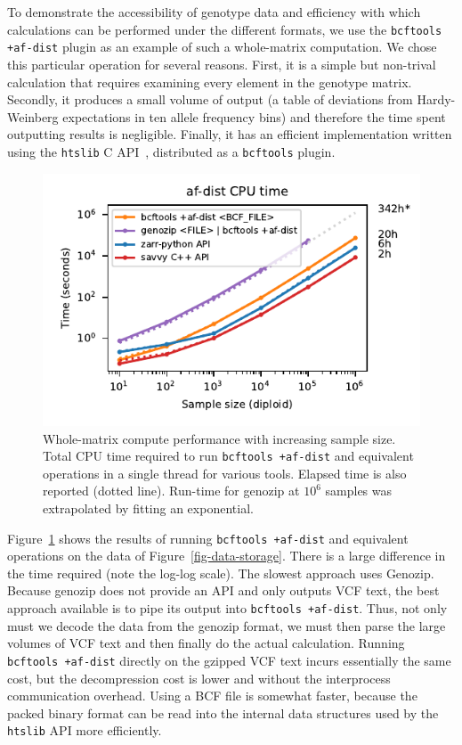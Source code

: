 \documentclass[a4paper,num-refs]{oup-contemporary}
\begin{document}
To demonstrate the accessibility of genotype data and efficiency with 
which calculations can be performed under the different formats,
we use the \texttt{bcftools +af-dist} plugin as an example of such a whole-matrix
computation. 
We chose this particular operation for several
reasons. First, it is a simple but non-trival calculation that requires 
examining every element in the genotype matrix.
Secondly, it produces a small volume of output (a table of
deviations from Hardy-Weinberg expectations in ten allele frequency
bins) and therefore the time spent outputting results is negligible.
Finally, it has an efficient implementation written using the 
\texttt{htslib} C API~\citep{bonfield2021htslib}, distributed as 
a \texttt{bcftools} plugin. 

\begin{figure}
\includegraphics{figures/whole-matrix-compute}
\caption{Whole-matrix compute performance with increasing sample size.
Total CPU time required to run \texttt{bcftools +af-dist}
and equivalent operations in a single thread for various tools.
Elapsed time is also reported (dotted line). Run-time for genozip
at $10^6$ samples was extrapolated by fitting an exponential.
\label{fig-whole-matrix-compute}}
\end{figure}

Figure~\ref{fig-whole-matrix-compute} shows the results of 
running \texttt{bcftools +af-dist} and equivalent operations 
on the data of Figure~\ref{fig-data-storage}. There is a large
difference in the time required (note the log-log scale). 
The slowest approach uses Genozip. Because genozip does not
provide an API and only outputs VCF text, the best approach available 
is to pipe its output into \texttt{bcftools +af-dist}. Thus,
not only must we decode the data from the genozip format, we must 
then parse the large volumes of VCF text and then finally do the 
actual calculation. Running \texttt{bcftools +af-dist} directly
on the gzipped VCF text incurs essentially the same cost, but
the decompression cost is lower and without the interprocess 
communication overhead. Using a BCF file is somewhat faster,
because the packed binary format can be read into the internal 
data structures used by the \texttt{htslib} API more efficiently.
\end{document}
